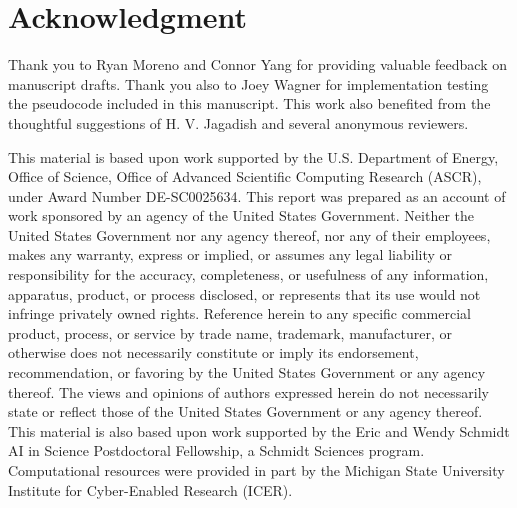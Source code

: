 \section*{Acknowledgment}

Thank you to Ryan Moreno and Connor Yang for providing valuable feedback on manuscript drafts.
Thank you also to Joey Wagner for implementation testing the pseudocode included in this manuscript.
This work also benefited from the thoughtful suggestions of H. V. Jagadish and several anonymous reviewers.

This material is based upon work supported by the U.S. Department of Energy, Office of Science, Office of Advanced Scientific Computing Research (ASCR), under Award Number DE-SC0025634.
This report was prepared as an account of work sponsored by an agency of the United States Government.
Neither the United States Government nor any agency thereof, nor any of their employees, makes any warranty, express or implied, or assumes any legal liability or responsibility for the accuracy, completeness, or usefulness of any information, apparatus, product, or process disclosed, or represents that its use would not infringe privately owned rights.
Reference herein to any specific commercial product, process, or service by trade name, trademark, manufacturer, or otherwise does not necessarily constitute or imply its endorsement, recommendation, or favoring by the United States Government or any agency thereof.
The views and opinions of authors expressed herein do not necessarily state or reflect those of the United States Government or any agency thereof.
This material is also based upon work supported by the Eric and Wendy Schmidt AI in Science Postdoctoral Fellowship, a Schmidt Sciences program.
Computational resources were provided in part by the Michigan State University Institute for Cyber-Enabled Research (ICER).

